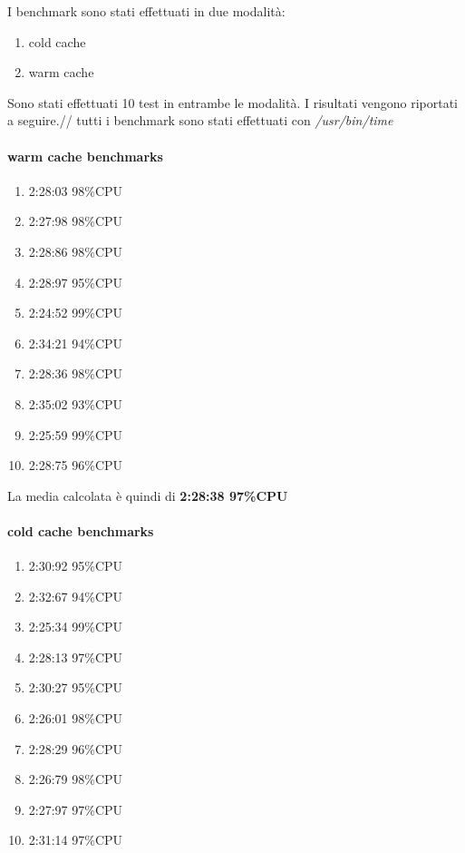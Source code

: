 \documentclass[11pt,a4paper,twoside,openright]{book}
\begin{document}
I benchmark sono stati effettuati in due modalità:
\begin{enumerate}
				\item cold cache
				\item warm cache
\end{enumerate}

Sono stati effettuati 10 test in entrambe le modalità. I risultati vengono riportati a seguire.//
tutti i benchmark sono stati effettuati con \textit{/usr/bin/time}

\paragraph{warm cache benchmarks}
\begin{enumerate}
				\item 2:28:03 98\%CPU
				\item 2:27:98 98\%CPU
				\item 2:28:86 98\%CPU
				\item 2:28:97 95\%CPU
				\item 2:24:52 99\%CPU
				\item 2:34:21 94\%CPU
				\item 2:28:36 98\%CPU
				\item 2:35:02 93\%CPU
				\item 2:25:59 99\%CPU
				\item 2:28:75 96\%CPU
\end{enumerate}

La media calcolata è quindi di \textbf{2:28:38 97\%CPU}

\paragraph{cold cache benchmarks}
\begin{enumerate}
				\item 2:30:92 95\%CPU
				\item 2:32:67 94\%CPU
				\item 2:25:34 99\%CPU
				\item 2:28:13 97\%CPU
				\item 2:30:27 95\%CPU
				\item 2:26:01 98\%CPU
				\item 2:28:29 96\%CPU
				\item 2:26:79 98\%CPU
				\item 2:27:97 97\%CPU
				\item 2:31:14 97\%CPU
\end{enumerate}
\end{document}
